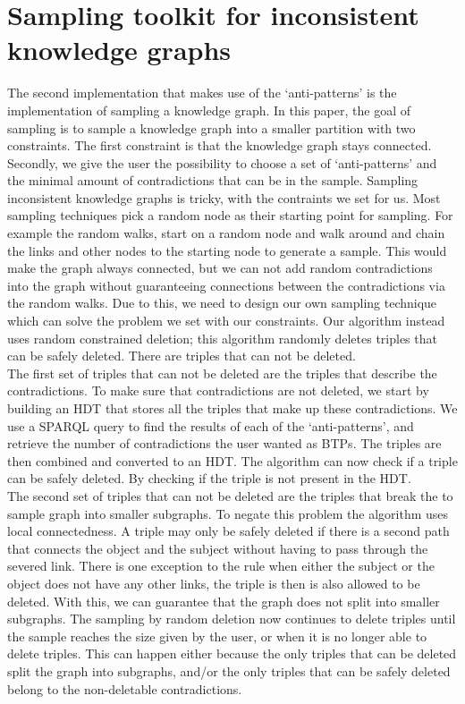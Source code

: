 \documentclass[11pt,letterpaper ,oneside ]{book}
\begin{document}
	\section{Sampling toolkit for inconsistent knowledge graphs}
	The second implementation that makes use of the `anti-patterns' is the implementation of sampling a knowledge graph. In this paper, the goal of sampling is to sample a knowledge graph into a smaller partition with two constraints. The first constraint is that the knowledge graph stays connected. Secondly, we give the user the possibility to choose a set of `anti-patterns' and the minimal amount of contradictions that can be in the sample.
	Sampling inconsistent knowledge graphs is tricky, with the contraints we set for us. Most sampling techniques pick a random node as their starting point for sampling. For example the random walks, start on a random node and walk around and chain the links and other nodes to the starting node to generate a sample. This would make the graph always connected, but we can not add random contradictions into the graph without guaranteeing connections between the contradictions via the random walks. Due to this, we need to design our own sampling technique which can solve the problem we set with our constraints.
	Our algorithm instead uses random constrained deletion; this algorithm randomly deletes triples that can be safely deleted. There are triples that can not be deleted.\\
	The first set of triples that can not be deleted are the triples that describe the contradictions. To make sure that contradictions are not deleted, we start by building an HDT\cite{FMPGPA:13}\cite{MPAF:12} that stores all the triples that make up these contradictions. We use a SPARQL query to find the results of each of the `anti-patterns', and retrieve the number of contradictions the user wanted as BTPs. The triples are then combined and converted to an HDT. The algorithm can now check if a triple can be safely deleted. By checking if the triple is not present in the HDT.\\
	The second set of triples that can not be deleted are the triples that break the to sample graph into smaller subgraphs. To negate this problem the algorithm uses local connectedness. A triple may only be safely deleted if there is a second path that connects the object and the subject without having to pass through the severed link.
	There is one exception to the rule when either the subject or the object does not have any other links, the triple is then is also allowed to be deleted. With this, we can guarantee that the graph does not split into smaller subgraphs. 
	The sampling by random deletion now continues to delete triples until the sample reaches the size given by the user, or when it is no longer able to delete triples. This can happen either because the only triples that can be deleted split the graph into subgraphs, and/or the only triples that can be safely deleted belong to the non-deletable contradictions.
	
\end{document}
